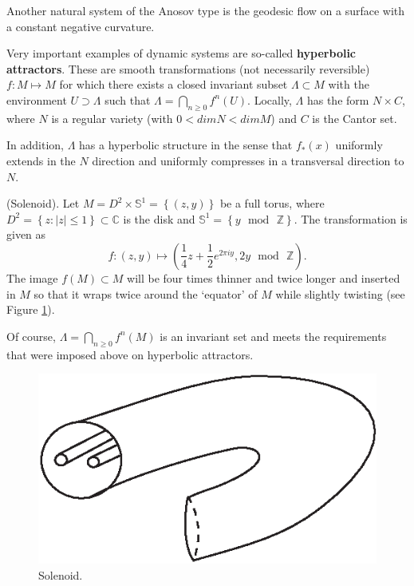 Another natural system of the Anosov type is the geodesic flow on a surface with a constant negative curvature.

Very important examples of dynamic systems are so-called \textbf{hyperbolic attractors}. These are smooth transformations (not necessarily reversible) $f:M\longmapsto M$ for which there exists a closed invariant subset $\Lambda \subset M$ with the environment $U\supset \Lambda $ such that $\Lambda =\bigcap_{n\geq 0}f^{n}(U)$. Locally, $\Lambda $ has the form $N\times C$, where $N$ is a regular variety (with $0 <dim N <dim M$) and $C$ is the Cantor set.

In addition, $\Lambda$ has a hyperbolic structure in the sense that $f_{\ast }(x)$ uniformly extends in the $N$ direction and uniformly compresses in a transversal direction to $N$.

\begin{example}(Solenoid).
	Let $M=D^{2}\times \mathbb{S}%
	^{1}=\left\{ \left( z,y\right) \right\}$ be a full torus, where $D^{2}=\left\{ z:\left\vert z\right\vert \leq 1\right\} \subset \mathbb{C}$ is the disk and $\mathbb{S}^{1}=\left\{ y\text{ }\textrm{mod}\text{ }\mathbb{Z}%
	\right\} $. The transformation is given as$$
	f:\left( z,y\right) \longmapsto \left( \frac{1}{4}z+\frac{1}{2}e^{2\pi iy},2y%
	\text{ }\textrm{mod}\text{ }\mathbb{Z}\right) .
	$$
	The image $f(M)\subset M$ will be four times thinner and twice longer and inserted in $M$ so that it wraps twice around the `equator' of $M$ while slightly twisting (see Figure \ref{fig:5.11}).
	
	Of course, $\Lambda =\bigcap_{n\geq 0}f^{n}(M)$ is an invariant set and meets the requirements that were imposed above on hyperbolic attractors.
\end{example}

\begin{figure}[!ht]
	\centering
	\includegraphics [scale=1.4]{jtr511}
	\caption{Solenoid.}
	\label{fig:5.11}
\end{figure}

